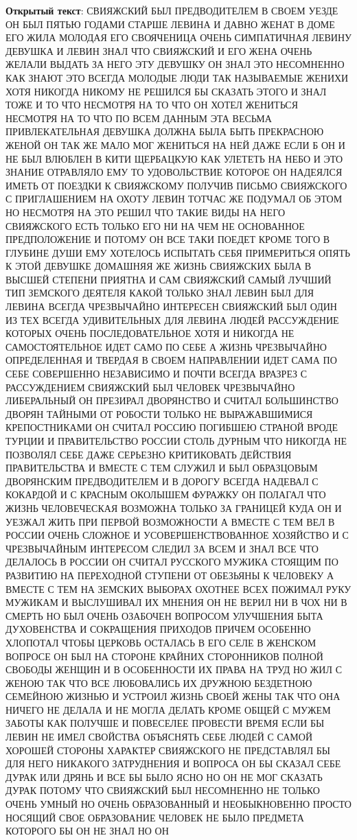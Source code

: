 \documentclass[12pt, a4paper] {ncc}
\begin{document}
\textbf{Открытый текст}:
СВИЯЖСКИЙ БЫЛ ПРЕДВОДИТЕЛЕМ В СВОЕМ УЕЗДЕ ОН БЫЛ ПЯТЬЮ ГОДАМИ СТАРШЕ ЛЕВИНА И ДАВНО ЖЕНАТ В ДОМЕ ЕГО ЖИЛА МОЛОДАЯ ЕГО СВОЯЧЕНИЦА ОЧЕНЬ СИМПАТИЧНАЯ ЛЕВИНУ ДЕВУШКА И ЛЕВИН ЗНАЛ ЧТО СВИЯЖСКИЙ И ЕГО ЖЕНА ОЧЕНЬ ЖЕЛАЛИ ВЫДАТЬ ЗА НЕГО ЭТУ ДЕВУШКУ ОН ЗНАЛ ЭТО НЕСОМНЕННО КАК ЗНАЮТ ЭТО ВСЕГДА МОЛОДЫЕ ЛЮДИ ТАК НАЗЫВАЕМЫЕ ЖЕНИХИ ХОТЯ НИКОГДА НИКОМУ НЕ РЕШИЛСЯ БЫ СКАЗАТЬ ЭТОГО И ЗНАЛ ТОЖЕ И ТО ЧТО НЕСМОТРЯ НА ТО ЧТО ОН ХОТЕЛ ЖЕНИТЬСЯ НЕСМОТРЯ НА ТО ЧТО ПО ВСЕМ ДАННЫМ ЭТА ВЕСЬМА ПРИВЛЕКАТЕЛЬНАЯ ДЕВУШКА ДОЛЖНА БЫЛА БЫТЬ ПРЕКРАСНОЮ ЖЕНОЙ ОН ТАК ЖЕ МАЛО МОГ ЖЕНИТЬСЯ НА НЕЙ ДАЖЕ ЕСЛИ Б ОН И НЕ БЫЛ ВЛЮБЛЕН В КИТИ ЩЕРБАЦКУЮ КАК УЛЕТЕТЬ НА НЕБО И ЭТО ЗНАНИЕ ОТРАВЛЯЛО ЕМУ ТО УДОВОЛЬСТВИЕ КОТОРОЕ ОН НАДЕЯЛСЯ ИМЕТЬ ОТ ПОЕЗДКИ К СВИЯЖСКОМУ ПОЛУЧИВ ПИСЬМО СВИЯЖСКОГО С ПРИГЛАШЕНИЕМ НА ОХОТУ ЛЕВИН ТОТЧАС ЖЕ ПОДУМАЛ ОБ ЭТОМ НО НЕСМОТРЯ НА ЭТО РЕШИЛ ЧТО ТАКИЕ ВИДЫ НА НЕГО СВИЯЖСКОГО ЕСТЬ ТОЛЬКО ЕГО НИ НА ЧЕМ НЕ ОСНОВАННОЕ ПРЕДПОЛОЖЕНИЕ И ПОТОМУ ОН ВСЕ ТАКИ ПОЕДЕТ КРОМЕ ТОГО В ГЛУБИНЕ ДУШИ ЕМУ ХОТЕЛОСЬ ИСПЫТАТЬ СЕБЯ ПРИМЕРИТЬСЯ ОПЯТЬ К ЭТОЙ ДЕВУШКЕ ДОМАШНЯЯ ЖЕ ЖИЗНЬ СВИЯЖСКИХ БЫЛА В ВЫСШЕЙ СТЕПЕНИ ПРИЯТНА И САМ СВИЯЖСКИЙ САМЫЙ ЛУЧШИЙ ТИП ЗЕМСКОГО ДЕЯТЕЛЯ КАКОЙ ТОЛЬКО ЗНАЛ ЛЕВИН БЫЛ ДЛЯ ЛЕВИНА ВСЕГДА ЧРЕЗВЫЧАЙНО ИНТЕРЕСЕН СВИЯЖСКИЙ БЫЛ ОДИН ИЗ ТЕХ ВСЕГДА УДИВИТЕЛЬНЫХ ДЛЯ ЛЕВИНА ЛЮДЕЙ РАССУЖДЕНИЕ КОТОРЫХ ОЧЕНЬ ПОСЛЕДОВАТЕЛЬНОЕ ХОТЯ И НИКОГДА НЕ САМОСТОЯТЕЛЬНОЕ ИДЕТ САМО ПО СЕБЕ А ЖИЗНЬ ЧРЕЗВЫЧАЙНО ОПРЕДЕЛЕННАЯ И ТВЕРДАЯ В СВОЕМ НАПРАВЛЕНИИ ИДЕТ САМА ПО СЕБЕ СОВЕРШЕННО НЕЗАВИСИМО И ПОЧТИ ВСЕГДА ВРАЗРЕЗ С РАССУЖДЕНИЕМ СВИЯЖСКИЙ БЫЛ ЧЕЛОВЕК ЧРЕЗВЫЧАЙНО ЛИБЕРАЛЬНЫЙ ОН ПРЕЗИРАЛ ДВОРЯНСТВО И СЧИТАЛ БОЛЬШИНСТВО ДВОРЯН ТАЙНЫМИ ОТ РОБОСТИ ТОЛЬКО НЕ ВЫРАЖАВШИМИСЯ КРЕПОСТНИКАМИ ОН СЧИТАЛ РОССИЮ ПОГИБШЕЮ СТРАНОЙ ВРОДЕ ТУРЦИИ И ПРАВИТЕЛЬСТВО РОССИИ СТОЛЬ ДУРНЫМ ЧТО НИКОГДА НЕ ПОЗВОЛЯЛ СЕБЕ ДАЖЕ СЕРЬЕЗНО КРИТИКОВАТЬ ДЕЙСТВИЯ ПРАВИТЕЛЬСТВА И ВМЕСТЕ С ТЕМ СЛУЖИЛ И БЫЛ ОБРАЗЦОВЫМ ДВОРЯНСКИМ ПРЕДВОДИТЕЛЕМ И В ДОРОГУ ВСЕГДА НАДЕВАЛ С КОКАРДОЙ И С КРАСНЫМ ОКОЛЫШЕМ ФУРАЖКУ ОН ПОЛАГАЛ ЧТО ЖИЗНЬ ЧЕЛОВЕЧЕСКАЯ ВОЗМОЖНА ТОЛЬКО ЗА ГРАНИЦЕЙ КУДА ОН И УЕЗЖАЛ ЖИТЬ ПРИ ПЕРВОЙ ВОЗМОЖНОСТИ А ВМЕСТЕ С ТЕМ ВЕЛ В РОССИИ ОЧЕНЬ СЛОЖНОЕ И УСОВЕРШЕНСТВОВАННОЕ ХОЗЯЙСТВО И С ЧРЕЗВЫЧАЙНЫМ ИНТЕРЕСОМ СЛЕДИЛ ЗА ВСЕМ И ЗНАЛ ВСЕ ЧТО ДЕЛАЛОСЬ В РОССИИ ОН СЧИТАЛ РУССКОГО МУЖИКА СТОЯЩИМ ПО РАЗВИТИЮ НА ПЕРЕХОДНОЙ СТУПЕНИ ОТ ОБЕЗЬЯНЫ К ЧЕЛОВЕКУ А ВМЕСТЕ С ТЕМ НА ЗЕМСКИХ ВЫБОРАХ ОХОТНЕЕ ВСЕХ ПОЖИМАЛ РУКУ МУЖИКАМ И ВЫСЛУШИВАЛ ИХ МНЕНИЯ ОН НЕ ВЕРИЛ НИ В ЧОХ НИ В СМЕРТЬ НО БЫЛ ОЧЕНЬ ОЗАБОЧЕН ВОПРОСОМ УЛУЧШЕНИЯ БЫТА ДУХОВЕНСТВА И СОКРАЩЕНИЯ ПРИХОДОВ ПРИЧЕМ ОСОБЕННО ХЛОПОТАЛ ЧТОБЫ ЦЕРКОВЬ ОСТАЛАСЬ В ЕГО СЕЛЕ В ЖЕНСКОМ ВОПРОСЕ ОН БЫЛ НА СТОРОНЕ КРАЙНИХ СТОРОННИКОВ ПОЛНОЙ СВОБОДЫ ЖЕНЩИН И В ОСОБЕННОСТИ ИХ ПРАВА НА ТРУД НО ЖИЛ С ЖЕНОЮ ТАК ЧТО ВСЕ ЛЮБОВАЛИСЬ ИХ ДРУЖНОЮ БЕЗДЕТНОЮ СЕМЕЙНОЮ ЖИЗНЬЮ И УСТРОИЛ ЖИЗНЬ СВОЕЙ ЖЕНЫ ТАК ЧТО ОНА НИЧЕГО НЕ ДЕЛАЛА И НЕ МОГЛА ДЕЛАТЬ КРОМЕ ОБЩЕЙ С МУЖЕМ ЗАБОТЫ КАК ПОЛУЧШЕ И ПОВЕСЕЛЕЕ ПРОВЕСТИ ВРЕМЯ ЕСЛИ БЫ ЛЕВИН НЕ ИМЕЛ СВОЙСТВА ОБЪЯСНЯТЬ СЕБЕ ЛЮДЕЙ С САМОЙ ХОРОШЕЙ СТОРОНЫ ХАРАКТЕР СВИЯЖСКОГО НЕ ПРЕДСТАВЛЯЛ БЫ ДЛЯ НЕГО НИКАКОГО ЗАТРУДНЕНИЯ И ВОПРОСА ОН БЫ СКАЗАЛ СЕБЕ ДУРАК ИЛИ ДРЯНЬ И ВСЕ БЫ БЫЛО ЯСНО НО ОН НЕ МОГ СКАЗАТЬ ДУРАК ПОТОМУ ЧТО СВИЯЖСКИЙ БЫЛ НЕСОМНЕННО НЕ ТОЛЬКО ОЧЕНЬ УМНЫЙ НО ОЧЕНЬ ОБРАЗОВАННЫЙ И НЕОБЫКНОВЕННО ПРОСТО НОСЯЩИЙ СВОЕ ОБРАЗОВАНИЕ ЧЕЛОВЕК НЕ БЫЛО ПРЕДМЕТА КОТОРОГО БЫ ОН НЕ ЗНАЛ НО ОН 
\end{document}
